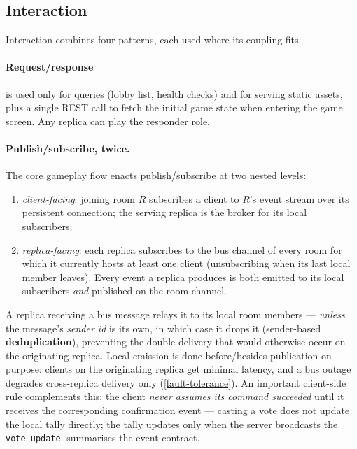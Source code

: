 \documentclass{scrartcl}
\begin{document}
\subsection{Interaction}\label{interaction}

Interaction combines four patterns, each used where its coupling fits.

\paragraph{Request/response} is used only for queries (lobby list, health checks)
and for serving static assets, plus a single REST call to fetch the initial game
state when entering the game screen. Any replica can play the responder role.

\paragraph{Publish/subscribe, twice.}
The core gameplay flow enacts publish/subscribe at two nested levels:
\begin{enumerate}
      \item \emph{client-facing}: joining room $R$ subscribes a client to $R$'s event
            stream over its persistent connection; the serving replica is the broker for
            its local subscribers;
      \item \emph{replica-facing}: each replica subscribes to the bus channel of
            every room for which it currently hosts at least one client (unsubscribing when
            its last local member leaves). Every event a replica produces is both emitted
            to its local subscribers \emph{and} published on the room channel.
\end{enumerate}
A replica receiving a bus message relays it to its local room members ---
\emph{unless} the message's \emph{sender id} is its own, in which case it drops it
(sender-based \textbf{deduplication}), preventing the double delivery that would
otherwise occur on the originating replica. Local emission is done before/besides
publication on purpose: clients on the originating replica get minimal latency,
and a bus outage degrades cross-replica delivery only (\cref{fault-tolerance}).
An important client-side rule complements this: the client \emph{never assumes
      its command succeeded} until it receives the corresponding confirmation event ---
casting a vote does not update the local tally directly; the tally updates only
when the server broadcasts the \texttt{vote\_update}. 
summarises the event contract.
\end{document}
